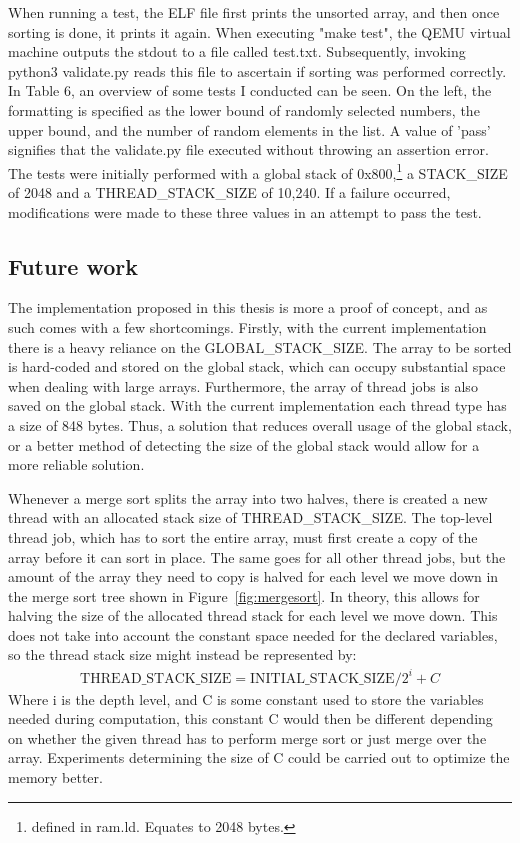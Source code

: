 When running a test, the ELF file first prints the unsorted array, and then once
sorting is done, it prints it again. When executing "make test", the QEMU
virtual machine outputs the stdout to a file called test.txt. Subsequently,
invoking python3 validate.py reads this file to ascertain if sorting was
performed correctly. In Table 6, an overview of some tests I conducted can be
seen. On the left, the formatting is specified as the lower bound of randomly
selected numbers, the upper bound, and the number of random elements in the
list. A value of 'pass' signifies that the validate.py file executed without
throwing an assertion error. The tests were initially performed with a global
stack of 0x800,\footnote{defined in ram.ld. Equates to 2048 bytes.} a
STACK_SIZE of 2048 and a THREAD_STACK_SIZE of 10,240. If a failure occurred,
modifications were made to these three values in an attempt to pass the test.

\subsection{Future work}
The implementation proposed in this thesis is more a proof of concept, and as
such comes with a few shortcomings. Firstly, with the current implementation
there is a heavy reliance on the GLOBAL_STACK_SIZE. The array to be sorted is
hard-coded and stored on the global stack, which can occupy substantial space
when dealing with large arrays. Furthermore, the array of thread jobs is also
saved on the global stack. With the current implementation each thread type has
a size of 848 bytes. Thus, a solution that reduces overall usage of the global
stack, or a better method of detecting the size of the global stack would allow
for a more reliable solution.

Whenever a merge sort splits the array into two halves, there is created a new
thread with an allocated stack size of THREAD_STACK_SIZE. The top-level thread
job, which has to sort the entire array, must first create a copy of the array
before it can sort in place. The same goes for all other thread jobs, but the
amount of the array they need to copy is halved for each level we move down in
the merge sort tree shown in Figure~\ref{fig:mergesort}. In theory, this allows
for halving the size of the allocated thread stack for each level we move down.
This does not take into account the constant space needed for the declared
variables, so the thread stack size might instead be represented by:
\begin{align}
  \text{THREAD\_STACK\_SIZE} = \text{INITIAL\_STACK\_SIZE} / 2^i + C
\end{align}
Where i is the depth level, and C is some constant used to store the variables
needed during computation, this constant C would then be different depending on
whether the given thread has to perform merge sort or just merge over the array.
Experiments determining the size of C could be carried out to optimize the
memory better.

